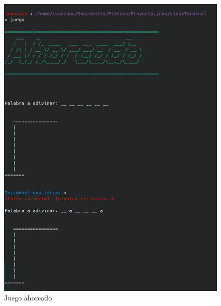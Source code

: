 \documentclass[letter,11pt]{article}
\begin{document}
\begin{figure} [H]
    \centering 
    \caption{Juego ahorcado}
    \includegraphics[scale=.7]{ahorcado1.png} 
\end{figure}
\end{document}
